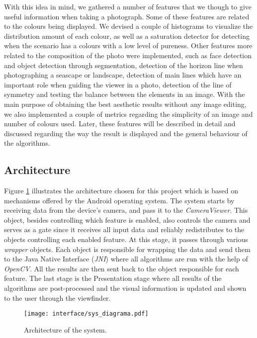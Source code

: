 With this idea in mind, we gathered a number of features that we though to give useful information when taking a photograph. Some of these features are related to the colours being displayed. We devised a couple of histograms to visualize the distribution amount of each colour, as well as a saturation detector for detecting when the scenario has a colours with a low level of pureness. Other features more related to the composition of the photo were implemented, such as face detection and object detection through segmentation, detection of the horizon line when photographing a seascape or landscape, detection of main lines which have an important role when guiding the viewer in a photo, detection of the line of symmetry and testing the balance between the elements in an image. With the main purpose of obtaining the best aesthetic results without any image editing, we also implemented a couple of metrics regarding the simplicity of an image and number of colours used. Later, these features will be described in detail and discussed regarding the way the result is displayed and the general behaviour of the algorithms.

\subsection{Architecture}

Figure \ref{fig:sys_diagram} illustrates the architecture chosen for this project which is based on mechanisms offered by the Android operating system. The system starts by receiving data from the device's camera, and pass it to the \emph{CameraViewer}. This object, besides controlling which feature is enabled, also controls the camera and serves as a gate since it receives all input data and reliably redistributes to the objects controlling each enabled feature. 
At this stage, it passes through various \emph{wrapper} objects. Each object is responsible for wrapping the data and send them to the Java Native Interface (\emph{JNI}) where all algorithms are run with the help of \emph{OpenCV}. All the results are then sent back to the object responsible for each feature. The last stage is the Presentation stage where all results of the algorithms are post-processed and the visual information is updated and shown to the user through the viewfinder.

\begin{figure}[htb]
	\centering
	\texttt{[image: interface/sys\_diagrama.pdf]}
	\caption{Architecture of the system.}
	\label{fig:sys_diagram}
\end{figure}

